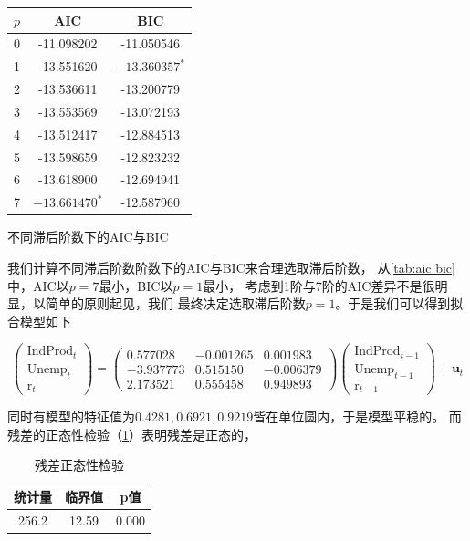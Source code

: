\documentclass[cn]{homework}
\begin{document}
    \begin{margintable}
        \centering
        \begin{tabular}{ccc}
            \toprule
            $p$ & AIC  & BIC \\
            \midrule
            0 & -11.098202& -11.050546\\
            1 & -13.551620& $-13.360357^*$ \\
            2 & -13.536611& -13.200779\\
            3 & -13.553569& -13.072193\\
            4 & -13.512417& -12.884513\\
            5 & -13.598659& -12.823232\\
            6 & -13.618900& -12.694941\\
            7 & $-13.661470^*$ & -12.587960\\
            \bottomrule
        \end{tabular}
        \caption{不同滞后阶数下的AIC与BIC}
        \label{tab:aic bic}
    \end{margintable}
    我们计算不同滞后阶数阶数下的AIC与BIC来合理选取滞后阶数，
    从\cref{tab:aic bic}中，AIC以$p=7$最小，BIC以$p=1$最小，
    考虑到1阶与7阶的AIC差异不是很明显，以简单的原则起见，我们
    最终决定选取滞后阶数$p=1$。于是我们可以得到拟合模型如下
    \begin{fullwidth}
    \def\ind{\text{IndProd}}
    \def\une{\text{Unemp}}
    \def\rrr{\text{r}}
    \[\begin{pmatrix}
        \ind_t\\
        \une_t\\
        \rrr_t
    \end{pmatrix}
    =\begin{pmatrix}
        0.577028 & -0.001265 & 0.001983 \\
        -3.937773 &  0.515150 & -0.006379 \\
        2.173521 & 0.555458 &  0.949893 
    \end{pmatrix}
    \begin{pmatrix}
        \ind_{t-1}\\
        \une_{t-1}\\
        \rrr_{t-1}
    \end{pmatrix}+\boldsymbol u_t\]
    \end{fullwidth}

    同时有模型的特征值为$0.4281,0.6921,0.9219$皆在单位圆内，于是模型平稳的。
    而残差的正态性检验（\cref{tab:normality}）表明残差是正态的，
    \begin{table}
        \centering
        \begin{tabular}{ccc}
            \toprule
            统计量 & 临界值 & p值 \\
            \midrule
            256.2 & 12.59 & 0.000
        \end{tabular}
        \caption{残差正态性检验}
        \label{tab:normality}
    \end{table}
\end{document}
